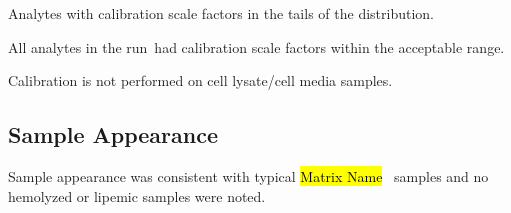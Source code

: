 \documentclass[11pt]{article}
\newif\ifshowSampleNotes  %
\newcommand{\MatrixName}{\hl{Matrix Name} }                  %
\newcommand{\Plural}{}
\newcommand{\NumCalFail}{\hl{X}}
\begin{document}

  \begin{table}[ht!]
    \begin{center}
      
      \caption{Analytes with calibration scale factors in the tails of the
        distribution\Plural.}
      \label{tab:caltail}
    \end{center}
  \end{table}

\else
All analytes in the run\Plural~had calibration scale factors within the
acceptable range.
\fi

\else  %
Calibration is not performed on cell lysate/cell media samples.
\fi    %




\ifshowSampleNotes
\newpage
\fi
\subsection{Sample Appearance} \label{sec:appear}

\ifshowSampleNotes

The sample appearance at the time of assay execution was noted by the assay
execution team and is summarized in Table~\ref{tab:sampleNotes}.

\hl{
The most common observations were lipemic and hemolyzed samples. There is no
conclusive evidence that the presence of lipids in a sample affects the
measurement of protein concentration however these samples should be treated
with caution. Hemolysis can cause an increase in measured hemoglobin
concentrations and a decrease in measured haptoglobin concentrations. These
samples may be contaminated with other intracellular proteins as well. Please
treat these samples with caution, sensitivity analysis is recommended.
}


\begin{table}[ht]
  \begin{center}
    
    \caption{Sample appearance notes at the time of assay execution.}
    \label{tab:sampleNotes}
  \end{center}
\end{table}

\else
Sample appearance was consistent with typical \MatrixName~samples and no
hemolyzed or lipemic samples were noted.
\fi
\end{document}
